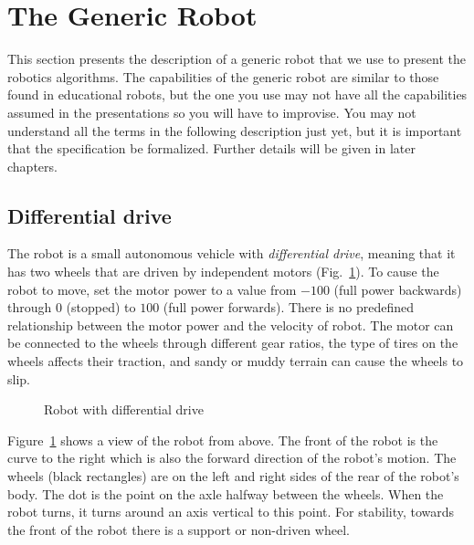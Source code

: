 \section{The Generic Robot}\label{s.generic}

This section presents the description of a generic robot that we use to present the robotics algorithms. The capabilities of the generic robot are similar to those found in educational robots, but the one you use may not have all the capabilities assumed in the presentations so you will have to improvise. You may not understand all the terms in the following description just yet, but it is important that the specification be formalized. Further details will be given in later chapters.

\subsection{Differential drive}

The robot is a small autonomous vehicle with \emph{differential drive}, meaning that it has two wheels that are driven by independent motors (Fig.~\ref{fig.differential}). To cause the robot to move, set the motor power to a value from $-100$ (full power backwards) through $0$ (stopped) to $100$ (full power forwards). There is no predefined relationship between the motor power and the velocity of robot. The motor can be connected to the wheels through different gear ratios, the type of tires on the wheels affects their traction, and sandy or muddy terrain can cause the wheels to slip.

\begin{figure}
\begin{center}
\end{center}
\caption{Robot with differential drive\label{fig.differential}}
\end{figure}

Figure~\ref{fig.differential} shows a view of the robot from above. The front of the robot is the curve to the right which is also the forward direction of the robot's motion. The wheels (black rectangles) are on the left and right sides of the rear of the robot's body. The dot is the point on the axle halfway between the wheels. When the robot turns, it turns around an axis vertical to this point. For stability, towards the front of the robot there is a support or non-driven wheel.


